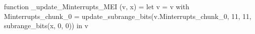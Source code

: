 function _update_Minterrupts_MEI (v, x) = let v = { v with Minterrupts_chunk_0 = update_subrange_bits(v.Minterrupts_chunk_0, 11, 11, subrange_bits(x, 0, 0)) } in
  v
